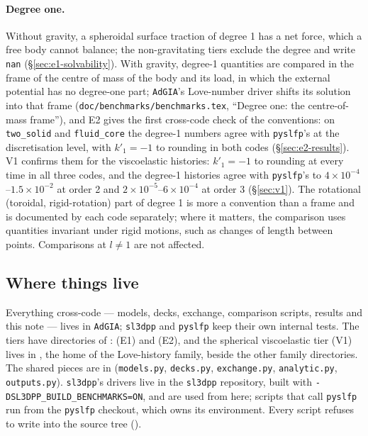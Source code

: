 \documentclass[11pt]{article}
\numberwithin{equation}{section}
\newcommand{\code}[1]{\texttt{#1}}
\begin{document}
\paragraph{Degree one.} Without gravity, a spheroidal surface traction of
degree 1 has a net force, which a free body cannot balance; the
non-gravitating tiers exclude the degree and write \code{nan}
(\S\ref{sec:e1-solvability}). With gravity, degree-1 quantities are
compared in the frame of the centre of mass of the body and its load, in
which the external potential has no degree-one part; \code{AdGIA}'s
Love-number driver shifts its solution into that frame
(\code{doc/benchmarks/benchmarks.tex}, ``Degree one: the centre-of-mass frame''), and
E2 gives the first cross-code check of the conventions: on
\code{two\_solid} and \code{fluid\_core} the degree-1 numbers agree with
\code{pyslfp}'s at the discretisation level, with $k'_1=-1$ to rounding in
both codes (\S\ref{sec:e2-results}). V1 confirms them for the viscoelastic
histories: $k'_1=-1$ to rounding at every time in all three codes, and the
degree-1 histories agree with \code{pyslfp}'s to
$4\times10^{-4}$--$1.5\times10^{-2}$ at order 2 and
$2\times10^{-5}$--$6\times10^{-4}$ at order 3 (\S\ref{sec:v1}). The rotational (toroidal, rigid-rotation) part of degree 1 is
more a convention than a frame and is documented by each code separately;
where it matters, the comparison uses quantities invariant under rigid
motions, such as changes of length between points. Comparisons at
$l\ne1$ are not affected.

\subsection{Where things live}
\label{sec:where}

Everything cross-code --- models, decks, exchange, comparison scripts,
results and this note --- lives in \code{AdGIA}; \code{sl3dpp} and
\code{pyslfp} keep their own internal tests. The tiers have directories of
:  (E1) and
 (E2), and the spherical viscoelastic tier (V1)
lives in , the home of the Love-history
family, beside the other family directories. The shared pieces are in 
(\code{models.py}, \code{decks.py}, \code{exchange.py}, \code{analytic.py},
\code{outputs.py}). \code{sl3dpp}'s drivers live in the \code{sl3dpp}
repository, built with \code{-DSL3DPP\_BUILD\_BENCHMARKS=ON}, and are used
from here; scripts that call \code{pyslfp} run from the \code{pyslfp}
checkout, which owns its environment. Every script refuses to write into
the source tree ().
\end{document}
